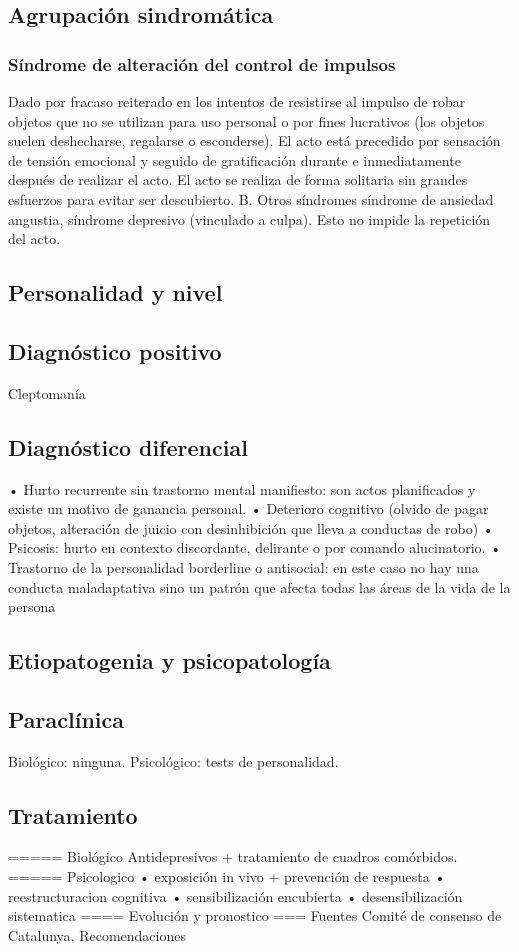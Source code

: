\documentclass{scrbook}
\begin{document}
\subsection*{Agrupación sindromática}
\subsubsection{Síndrome de alteración del control de impulsos}
Dado por fracaso reiterado en los intentos de resistirse al impulso de robar objetos que no se utilizan para uso personal o por fines lucrativos (los objetos suelen deshecharse, regalarse o esconderse). El acto está precedido por sensación de tensión emocional y seguido de gratificación durante e inmediatamente después de realizar el acto. El acto se realiza de forma solitaria sin grandes esfuerzos para evitar ser descubierto. B. Otros síndromes síndrome de ansiedad angustia, síndrome depresivo (vinculado a culpa). Esto no impide la repetición del acto.
\subsection*{Personalidad y nivel}
\subsection*{Diagnóstico positivo}
Cleptomanía
\subsection*{Diagnóstico diferencial}

• Hurto recurrente sin trastorno mental manifiesto: son actos planificados y existe un motivo de ganancia personal.
• Deterioro cognitivo (olvido de pagar objetos, alteración de juicio con desinhibición que lleva a conductas de robo)
• Psicosis: hurto en contexto discordante, delirante o por comando alucinatorio.
• Trastorno de la personalidad borderline o antisocial: en este caso no hay una conducta maladaptativa sino un patrón que afecta todas las áreas de la vida de la persona
\subsection*{Etiopatogenia y psicopatología}
\subsection*{Paraclínica}
Biológico: ninguna. Psicológico: tests de personalidad.
\subsection*{Tratamiento}
===== Biológico
Antidepresivos + tratamiento de cuadros comórbidos.
===== Psicologico
• exposición in vivo + prevención de respuesta
• reestructuracion cognitiva
• sensibilización encubierta
• desensibilización sistematica
==== Evolución y pronostico
=== Fuentes
Comité de consenso de Catalunya. Recomendaciones
\end{document}
